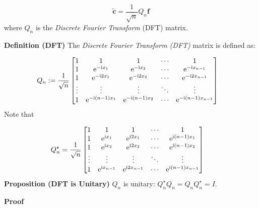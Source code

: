 \documentclass[12pt,landscape]{article}
\begin{document}
{\[
\widetilde{\mathbf{c}} = \frac{1}{\sqrt{n}}Q_{n}\mathbf{f}
\]
where $Q_n$ is the \emph{Discrete Fourier Transform} (DFT) matrix.

\textbf{Definition (DFT)} The \emph{Discrete Fourier Transform (DFT)} matrix is defined as:


\begin{align*}
Q_n &:= {1 \over \sqrt{n}} \begin{bmatrix} 1 & 1 & 1&  \ensuremath{\cdots} & 1 \\
                                    1 & {\rm e}^{-{\rm i} x_1} & {\rm e}^{-{\rm i} x_2} & \ensuremath{\cdots} & {\rm e}^{-{\rm i} x_{n-1}} \\
                                    1 & {\rm e}^{-{\rm i} 2 x_1} & {\rm e}^{-{\rm i} 2 x_2} & \ensuremath{\cdots} & {\rm e}^{-{\rm i} 2x_{n-1}} \\
                                    \ensuremath{\vdots} & \ensuremath{\vdots} & \ensuremath{\vdots} & \ensuremath{\ddots} & \ensuremath{\vdots} \\
                                    1 & {\rm e}^{-{\rm i} (n-1) x_1} & {\rm e}^{-{\rm i} (n-1) x_2} & \ensuremath{\cdots} & {\rm e}^{-{\rm i} (n-1) x_{n-1}}
\end{bmatrix} 
\end{align*}
Note that


\begin{align*}
Q_n^\ensuremath{\star} &= {1 \over \sqrt{n}} \begin{bmatrix}
1 & 1 & 1&  \ensuremath{\cdots} & 1 \\
1 & {\rm e}^{{\rm i} x_1} & {\rm e}^{{\rm i} 2 x_1} & \ensuremath{\cdots} & {\rm e}^{{\rm i} (n-1) x_1} \\
1 &  {\rm e}^{{\rm i} x_2}  & {\rm e}^{{\rm i} 2 x_2} & \ensuremath{\cdots} & {\rm e}^{{\rm i} (n-1)x_2} \\
\ensuremath{\vdots} & \ensuremath{\vdots} & \ensuremath{\vdots} & \ensuremath{\ddots} & \ensuremath{\vdots} \\
1 & {\rm e}^{{\rm i} x_{n-1}} & {\rm e}^{{\rm i} 2 x_{n-1}} & \ensuremath{\cdots} & {\rm e}^{{\rm i} (n-1) x_{n-1}}
\end{bmatrix} 
\end{align*}
\textbf{Proposition (DFT is Unitary)} $Q_n$ is unitary: $Q_n^\ensuremath{\star} Q_n = Q_n Q_n^\ensuremath{\star} = I$.

\textbf{Proof}

}
\end{document}
